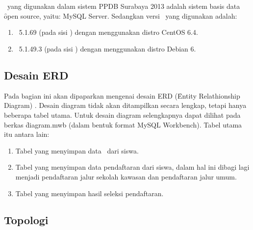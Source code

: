 \chapter{\babDua}
\section{\Database}
\label{sec:database}

\Database~yang digunakan dalam sistem PPDB Surabaya 2013 adalah sistem basis
data \f{open source}, yaitu: MySQL Server. Sedangkan versi \database~yang
digunakan adalah:

\begin{enumerate}
  \item \mysql~5.1.69 (pada sisi \master) dengan menggunakan distro CentOS 6.4.
  \item \mysql~5.1.49.3 (pada sisi \slave) dengan menggunakan distro Debian 6.
\end{enumerate}


\section{Desain ERD \Database}
\label{sec:desain_erd}

Pada bagian ini akan dipaparkan mengenai desain ERD (\f{Entity Relathionship
Diagram}) \database. Desain diagram tidak akan ditampilkan secara lengkap,
tetapi hanya beberapa tabel utama. Untuk desain diagram selengkapnya dapat
dilihat pada berkas \f{diagram.mwb} (dalam bentuk format MySQL Workbench).
Tabel utama itu antara lain:

\begin{enumerate}
  \item Tabel yang menyimpan data \master~dari siswa.
  \item Tabel yang menyimpan data pendaftaran dari siswa, dalam hal ini dibagi
    lagi menjadi pendaftaran jalur sekolah kawasan dan pendaftaran jalur umum.
  \item Tabel yang menyimpan hasil seleksi pendaftaran.
\end{enumerate}



\section{Topologi \Database}
\label{sec:topologi_database}


